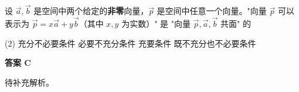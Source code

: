 \begin{choice}[topic={空间向量的共面条件}]
设 $\vec{a}, \vec{b}$ 是空间中两个给定的\textbf{非零}向量，$\vec{p}$ 是空间中任意一个向量。"向量 $\vec{p}$ 可以表示为 $\vec{p} = x\vec{a} + y\vec{b}$（其中 $x, y$ 为实数）" 是 "向量 $\vec{p}, \vec{a}, \vec{b}$ 共面" 的
\begin{tasks}(2)
	\task 充分不必要条件
	\task 必要不充分条件
	\task 充要条件
	\task 既不充分也不必要条件
\end{tasks}
\end{choice}
\begin{choice-sol}
\textbf{答案 C}

待补充解析。
\end{choice-sol}
